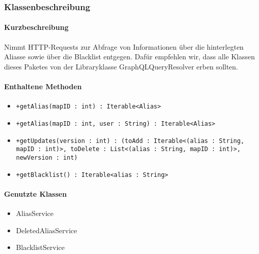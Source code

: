 \subsubsection*{Klassenbeschreibung}%
\paragraph*{Kurzbeschreibung}
Nimmt HTTP-Requests zur Abfrage von Informationen über die hinterlegten Aliasse sowie über die Blacklist entgegen.
Dafür empfehlen wir, dass alle Klassen dieses Paketes von der Libraryklasse \dq GraphQLQueryResolver \dq erben sollten.
\paragraph*{Enthaltene Methoden}
\begin{itemize}
    \item \texttt{+getAlias(mapID : int) : Iterable<Alias>}
    \item \texttt{+getAlias(mapID : int, user : String) : Iterable<Alias>}
    \item \texttt{+getUpdates(version : int) : (toAdd : Iterable<(alias : String, mapID : int)>, toDelete : List<(alias : String, mapID : int)>, newVersion : int)}
    \item \texttt{+getBlacklist() : Iterable<alias : String>}
\end{itemize}
\paragraph*{Genutzte Klassen}
\begin{itemize}
    \item AliasService
    \item DeletedAliasService
    \item BlacklistService
\end{itemize}